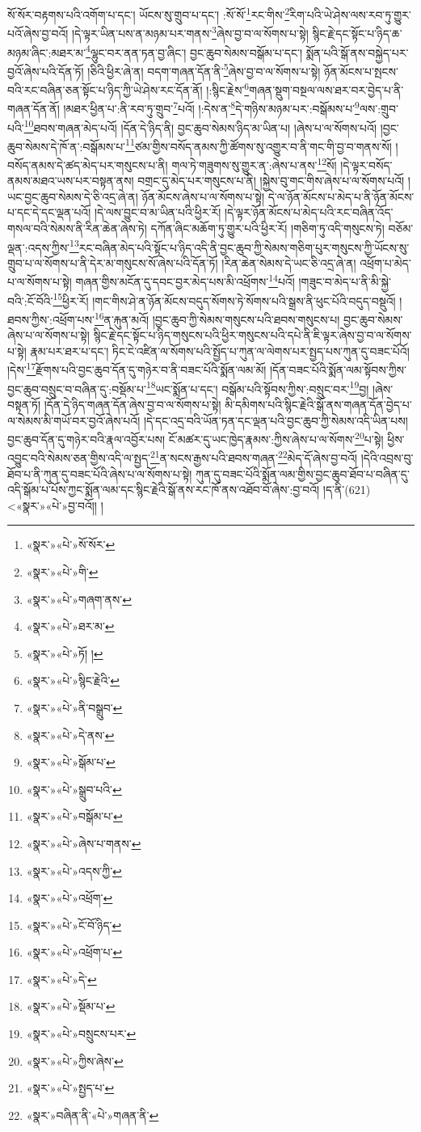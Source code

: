 སོ་སོར་བརྟགས་པའི་འགོག་པ་དང་། ཡོངས་སུ་གྲུབ་པ་དང་། :སོ་སོ་\footnote{«སྣར་»«པེ་»སོ་སོར་}རང་གིས་\footnote{«སྣར་»«པེ་»གི་}རིག་པའི་ཡེ་ཤེས་ལས་རབ་ཏུ་གྱུར་པའོ་ཞེས་བྱ་བའོ། །དེ་ལྟར་ཡིན་པས་ན་མཉམ་པར་གནས་\footnote{«སྣར་»«པེ་»གཞག་ནས་}ཞེས་བྱ་བ་ལ་སོགས་པ་སྟེ། སྙིང་རྗེ་དང་སྟོང་པ་ཉིད་ཆ་མཉམ་ཞིང་:མཐར་མ་\footnote{«སྣར་»«པེ་»ཐར་མ་}ལྷུང་བར་ནན་ཏན་བྱ་ཞིང་། བྱང་ཆུབ་སེམས་བསྒོམ་པ་དང་། སྨོན་པའི་སྒོ་ནས་བསྐྱེད་པར་བྱའོ་ཞེས་པའི་དོན་ཏོ། །ཅིའི་ཕྱིར་ཞེ་ན། བདག་གཞན་དོན་ནི་\footnote{«སྣར་»«པེ་»ཏོ། །}ཞེས་བྱ་བ་ལ་སོགས་པ་སྟེ། ཉོན་མོངས་པ་སྤངས་བའི་རང་བཞིན་ཅན་སྟོང་པ་ཉིད་ཀྱི་ཡེ་ཤེས་རང་དོན་ནོ། །:སྙིང་རྗེས་\footnote{«སྣར་»«པེ་»སྙིང་རྗེའི་}གཞན་སྡུག་བསྔལ་ལས་ཐར་བར་བྱེད་པ་ནི་གཞན་དོན་ནོ། །མཐར་ཕྱིན་པ་:ནི་རབ་ཏུ་གྲུབ་\footnote{«སྣར་»«པེ་»ནི་བསྒྲུབ་}པའོ། །:དེས་ན་\footnote{«སྣར་»«པེ་»དེ་ནས་}དེ་གཉིས་མཉམ་པར་:བསྒོམས་པ་\footnote{«སྣར་»«པེ་»སྒོམ་པ་}ལས་:གྲུབ་པའི་\footnote{«སྣར་»«པེ་»སྒྲུབ་པའི་}ཐབས་གཞན་མེད་པའོ། །དོན་དེ་ཉིད་ནི། བྱང་ཆུབ་སེམས་ཉིད་མ་ཡིན་པ། །ཞེས་པ་ལ་སོགས་པའོ། །བྱང་ཆུབ་སེམས་དེ་ཁོ་ན་:བསྒོམས་པ་\footnote{«སྣར་»«པེ་»བསྒོམ་པ་}ཙམ་གྱིས་བསོད་ནམས་ཀྱི་ཚོགས་སུ་འགྱུར་བ་ནི་གང་གི་བྱ་བ་གནས་སོ། །བསོད་ནམས་དེ་ཚད་མེད་པར་གསུངས་པ་ནི། གལ་ཏེ་གཟུགས་སུ་གྱུར་ན་:ཞེས་པ་ནས་\footnote{«སྣར་»«པེ་»ཞེས་པ་གནས་}སོ། །དེ་ལྟར་བསོད་ནམས་མཐའ་ཡས་པར་བསྟན་ནས། བགྲང་དུ་མེད་པར་གསུངས་པ་ནི། །སྐྱེས་བུ་གང་གིས་ཞེས་པ་ལ་སོགས་པའོ། །ཡང་བྱང་ཆུབ་སེམས་དེ་ཅི་འདྲ་ཞེ་ན། ཉོན་མོངས་ཞེས་པ་ལ་སོགས་པ་སྟེ། དེ་ལ་ཉོན་མོངས་པ་མེད་པ་ནི་ཉོན་མོངས་པ་དང་དེ་དང་ལྡན་པའོ། །དེ་ལས་བྱུང་བ་མ་ཡིན་པའི་ཕྱིར་རོ། །དེ་ལྟར་ཉོན་མོངས་པ་མེད་པའི་རང་བཞིན་འོད་གསལ་བའི་སེམས་ནི་རིན་ཆེན་ཞེས་ཏེ། དཀོན་ཞིང་མཆོག་ཏུ་གྱུར་པའི་ཕྱིར་རོ། །གཅིག་ཏུ་འདི་གསུངས་ཏེ། བཅོམ་ལྡན་:འདས་ཀྱིས་\footnote{«སྣར་»«པེ་»འདས་ཀྱི་}རང་བཞིན་མེད་པའི་སྟོང་པ་ཉིད་འདི་ནི་བྱང་ཆུབ་ཀྱི་སེམས་གཅིག་པུར་གསུངས་ཀྱི་ཡོངས་སུ་གྲུབ་པ་ལ་སོགས་པ་ནི་དེར་མ་གསུངས་སོ་ཞེས་པའི་དོན་ཏོ། །རིན་ཆེན་སེམས་དེ་ཡང་ཅི་འདྲ་ཞེ་ན། འཕྲོག་པ་མེད་པ་ལ་སོགས་པ་སྟེ། གཞན་གྱིས་མངོན་དུ་དབང་བྱར་མེད་པས་མི་འཕྲོགས་\footnote{«སྣར་»«པེ་»འཕྲོག་}པའོ། །གཟུང་བ་མེད་པ་ནི་མི་སྐྱེ་བའི་:ངོ་བོའི་\footnote{«སྣར་»«པེ་»ངོ་བོ་ཉིད་}ཕྱིར་རོ། །གང་གིས་ཤེ་ན་ཉོན་མོངས་བདུད་སོགས་ཏེ་སོགས་པའི་སྒྲས་ནི་ཕུང་པོའི་བདུད་བསྡུའོ། །ཐབས་ཀྱིས་:འཕྲོག་པས་\footnote{«སྣར་»«པེ་»འཕྲོག་པ་}ན་རྐུན་མའོ། །བྱང་ཆུབ་ཀྱི་སེམས་གསུངས་པའི་ཐབས་གསུངས་པ། བྱང་ཆུབ་སེམས་ཞེས་པ་ལ་སོགས་པ་སྟེ། སྙིང་རྗེ་དང་སྟོང་པ་ཉིད་གསུངས་པའི་ཕྱིར་གསུངས་པའི་དཔེ་ནི་ཇི་ལྟར་ཞེས་བྱ་བ་ལ་སོགས་པ་སྟེ། རྣམ་པར་ཐར་པ་དང་། ཏིང་ངེ་འཛིན་ལ་སོགས་པའི་སྤྱོད་པ་ཀུན་ལ་ལེགས་པར་སྤྱད་པས་ཀུན་དུ་བཟང་པོའོ། །དེས་\footnote{«སྣར་»«པེ་»དེ་}རྫོགས་པའི་བྱང་ཆུབ་དོན་དུ་གཉེར་བ་ནི་བཟང་པོའི་སྨོན་ལམ་མོ། །དོན་བཟང་པོའི་སྨོན་ལམ་སྟོབས་ཀྱིས་བྱང་ཆུབ་བསྲུང་བ་བཞིན་དུ་:བསྡོམ་པ་\footnote{«སྣར་»«པེ་»སྡོམ་པ་}ཡང་སྨོན་པ་དང་། བསྒོམ་པའི་སྟོབས་ཀྱིས་:བསྲུང་བར་\footnote{«སྣར་»«པེ་»བསྲུངས་པར་}བྱ། །ཞེས་བསྟན་ཏོ། །དོན་དེ་ཉིད་གཞན་དོན་ཞེས་བྱ་བ་ལ་སོགས་པ་སྟེ། མི་དམིགས་པའི་སྙིང་རྗེའི་སྒོ་ནས་གཞན་དོན་བྱེད་པ་ལ་སེམས་མི་གཡོ་བར་བྱའོ་ཞེས་པའོ། །དེ་དང་འདྲ་བའི་ཡོན་ཏན་དང་ལྡན་པའི་བྱང་ཆུབ་ཀྱི་སེམས་འདི་ཡིན་པས། བྱང་ཆུབ་དོན་དུ་གཉེར་བའི་རྣལ་འབྱོར་པས། ངོ་མཚར་དུ་ཡང་ཁྱེད་རྣམས་:ཀྱིས་ཞེས་པ་ལ་སོགས་\footnote{«སྣར་»«པེ་»ཀྱིས་ཞེས་}པ་སྟེ། ཕྱིས་འབྱུང་བའི་སེམས་ཅན་གྱིས་འདི་ལ་སྤྱད་\footnote{«སྣར་»«པེ་»སྤྱད་པ་}ན་སངས་རྒྱས་པའི་ཐབས་གཞན་\footnote{«སྣར་»བཞིན་ནི་«པེ་»གཞན་ནི་}མེད་དོ་ཞེས་བྱ་བའོ། །དེའི་འབྲས་བུ་ཐོབ་པ་ནི་ཀུན་དུ་བཟང་པོའི་ཞེས་པ་ལ་སོགས་པ་སྟེ། ཀུན་དུ་བཟང་པོའི་སྨོན་ལམ་གྱིས་བྱང་ཆུབ་ཐོབ་པ་བཞིན་དུ་འདི་སྒོམ་པ་པོས་ཀྱང་སྨོན་ལམ་དང་སྙིང་རྗེའི་སྒོ་ནས་རང་ཁོ་ནས་འཐོབ་བོ་ཞེས་:བྱ་བའོ། །ད་ནི་(621) <«སྣར་»«པེ་»བྱ་བའོ།། །
